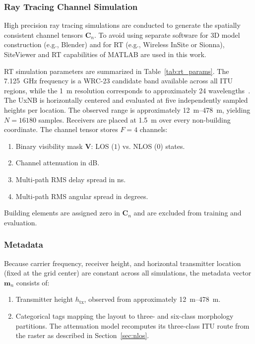 \documentclass[10pt,conference,letterpaper]{IEEEtran}
\begin{document}
\subsubsection{Ray Tracing Channel Simulation}
\label{sec:rt_sim}
High precision ray tracing simulations are conducted to generate the spatially consistent channel tensors $\mathbf{C}_n$. To avoid using separate software for 3D model construction (e.g., Blender) and for RT (e.g., Wireless InSite or Sionna), SiteViewer and RT capabilities of MATLAB are used in this work. %

RT simulation parameters are summarized in Table~\ref{tab:rt_params}. The
\SI{7.125}{GHz} frequency is a WRC-23 candidate band available across all ITU
regions, while the \SI{1}{m} resolution corresponds to approximately 24
wavelengths~\cite{saboor26}. The UxNB is horizontally centered and evaluated at
five independently sampled heights per location. The observed range is
approximately \SIrange{12}{478}{m}, yielding $N=16180$ samples. Receivers are
placed at \SI{1.5}{m} over every non-building coordinate. The channel tensor
stores $F=4$ channels:
\begin{enumerate}
    \item Binary visibility mask $\mathbf{V}$: LOS ($1$) vs. NLOS ($0$) states.
    \item Channel attenuation in dB.
    \item Multi-path RMS delay spread in ns.
    \item  Multi-path RMS angular spread in degrees.
\end{enumerate}
Building elements are assigned zero in $\mathbf{C}_n$ and are excluded from
training and evaluation.

\subsubsection{Metadata}
\label{sec:metadata}

Because carrier frequency, receiver height, and horizontal transmitter location (fixed at the grid center) are constant across all simulations, the metadata vector $\mathbf{m}_n$ consists of:
\begin{enumerate}
    \item Transmitter height $h_{\text{tx}}$, observed from approximately \SIrange{12}{478}{m}.
    \item Categorical tags mapping the layout to three- and six-class
    morphology partitions. The attenuation model recomputes its three-class
    ITU route from the raster as described in Section~\ref{sec:nlos}.
\end{enumerate}
\end{document}
